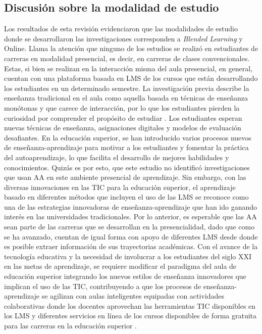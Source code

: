 \documentclass[spanish]{textolivre}
\begin{document}
\subsection*{Discusión sobre la modalidad de estudio}
Los resultados de esta revisión evidenciaron que las modalidades de estudio donde se desarrollaron las investigaciones corresponden a \emph{Blended Learning} y Online. Llama la atención que ninguno de los estudios se realizó en estudiantes de carreras en modalidad presencial, es decir, en carreras de clases convencionales. Estas, si bien se realizan en la interacción misma del aula presencial, en general, cuentan con una plataforma basada en LMS de los cursos que están desarrollando los estudiantes en un determinado semestre. La investigación previa describe la enseñanza tradicional en el aula como aquella basada en técnicas de enseñanza monótonas y que carece de interacción, por lo que los estudiantes pierden la curiosidad por comprender el propósito de estudiar \cite{priyaadharshini2020}. Los estudiantes esperan nuevas técnicas de enseñanza, asignaciones digitales y modelos de evaluación desafiantes. En la educación superior, se han introducido varios procesos nuevos de enseñanza-aprendizaje para motivar a los estudiantes y fomentar la práctica del autoaprendizaje, lo que facilita el desarrollo de mejores habilidades y conocimientos. Quizás es por esto, que este estudio no identificó investigaciones que usan AA en este ambiente presencial de aprendizaje. Sin embargo, con las diversas innovaciones en las TIC para la educación superior, el aprendizaje basado en diferentes métodos que incluyen el uso de las LMS se reconoce como una de las estrategias innovadoras de enseñanza-aprendizaje que han ido ganando interés en las universidades tradicionales. Por lo anterior, es esperable que las AA sean parte de las carreras que se desarrollan en la presencialidad, dado que como se ha avanzado, cuentan de igual forma con apoyo de diferentes LMS desde donde es posible extraer información de sus trayectorias académicas. Con el avance de la tecnología educativa y la necesidad de involucrar a los estudiantes del siglo XXI en las metas de aprendizaje, se requiere modificar el paradigma del aula de educación superior integrando los nuevos estilos de enseñanza innovadores que implican el uso de las TIC, contribuyendo a que los procesos de enseñanza-aprendizaje se agilizan con aulas inteligentes equipadas con actividades colaborativas donde los docentes aprovechan las herramientas TIC disponibles en los LMS y diferentes servicios en línea de los cursos disponibles de forma gratuita para las carreras en la educación superior \cite{srimadhaven2020}.
\end{document}
